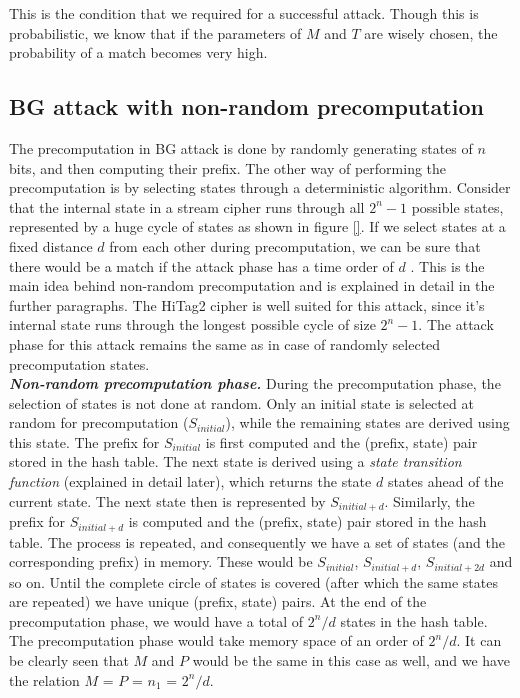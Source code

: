 This is the condition that we required for a successful attack. Though this is probabilistic, we know that if the parameters of $M$ and $T$ are wisely chosen, the probability of a match becomes very high.

\subsection{BG attack with non-random precomputation}
\label{sec:bg-nr}

The precomputation in BG attack is done by randomly generating states of $n$ bits, and then computing their prefix. The other way of performing the precomputation is by selecting states through a deterministic algorithm. Consider that the internal state in a stream cipher runs through all $2^n - 1$ possible states, represented by a huge cycle of states as shown in figure \ref{}. If we select states at a fixed distance $d$ from each other during precomputation, we can be sure that there would be a match if the attack phase has a time order of $d$ \cite{erik-discussions}. This is the main idea behind non-random precomputation and is explained in detail in the further paragraphs. The HiTag2 cipher is well suited for this attack, since it's internal state runs through the longest possible cycle of size $2^n - 1$. The attack phase for this attack remains the same as in case of randomly selected precomputation states.\\

\textit{\textbf{Non-random precomputation phase.}} During the precomputation phase, the selection of states is not done at random. Only an initial state is selected at random for precomputation ($S_{initial}$), while the remaining states are derived using this state. The prefix for $S_{initial}$ is first computed and the (prefix, state) pair stored in the hash table. The next state is derived using a \emph{state transition function} (explained in detail later), which returns the state $d$ states ahead of the current state. The next state then is represented by $S_{initial+d}$. Similarly, the prefix for $S_{initial+d}$ is computed and the (prefix, state) pair stored in the hash table. The process is repeated, and consequently we have a set of states (and the corresponding prefix) in memory. These would be $S_{initial}$, $S_{initial+d}$, $S_{initial+2d}$ and so on. Until the complete circle of states is covered (after which the same states are repeated) we have unique (prefix, state) pairs. At the end of the precomputation phase, we would have a total of $2^n/d$ states in the hash table. The precomputation phase would take memory space of an order of $2^n/d$. It can be clearly seen that $M$ and $P$ would be the same in this case as well, and we have the relation $M$ = $P$ = $n_1$ = $2^n/d$.\\

